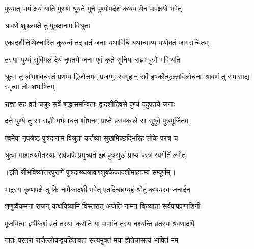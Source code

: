 

\twolineshloka
{पुण्यात् पापं क्षयं याति पुराणे श्रूयते मुने}
{पुण्योपदेशं कथय येन पापक्षयो भवेत्} %



\onelineshloka
{श्रावणे शुक्लपक्षे तु पुत्रदानाम विश्रुता} %

\twolineshloka
{एकादशीतिथिश्चास्ति कुरुध्वं तद् व्रतं जनाः}
{यथाविधि यथान्याय्य यथोक्तं जागरान्वितम्} %

\twolineshloka
{तस्याः पुण्यं सुविमलं देयं नृपतये जनाः}
{एवं कृते सुनिया राज्ञः पुत्रो भविष्यति} %

\threelineshloka
{श्रुत्वा तु लोमशवचस्तं प्रणम्य द्विजोत्तमम्}
{प्रजग्मुः स्वगृहान् सर्वे हषर्कोत्फुल्लविलोचनाः}
{श्रावणं तु समासाद्य स्मृत्वा लोमशभाषितम्} %

\twolineshloka
{राज्ञा सह व्रतं चक्रुः सर्वे श्रद्धासमन्विताः}
{द्वादशीदिवसे पुण्यं ददुपतये जनाः} %

\twolineshloka
{दत्ते पुण्ये तु सा राज्ञी गर्भमाधत्त शोभनम्}
{प्राप्ते प्रसवकाले सा सुषुवे पुत्रमूर्जितम्} %

\twolineshloka
{एवमेषा नृपश्रेष्ठ पुत्रदानाम विश्रुता}
{कर्तव्या सुखमिच्छद्भिरिह लोके परत्र च} %

\twolineshloka
{श्रुत्वा माहात्म्यमेतस्याः सर्वपापैः प्रमुच्यते}
{इह पुत्रसुखं प्राप्य परत्र स्वर्गतिं लभेत्} %

॥इति श्रीभविष्योत्तरपुराणे पुत्रदाख्यश्रावणशुक्कैकादशीमाहात्म्यं सम्पूर्णम्॥


\hyperref[sec:ekadashi_mahatmyam_vrata_raja]{\closesub}
\clearpage

\label{sec:vrata-raja-bhadrapada-krishnaja}


\twolineshloka
{भाद्रस्य कृष्णपक्षे तु किं नामैकादशी भवेत्}
{एतदिच्छाम्यहं श्रोतुं कथयस्व जनार्दन} %


\twolineshloka
{शृणुष्वैकमना राजन् कथयिष्यामि विस्तरात्}
{अजेति नाम्ना विख्याता सर्वपापप्रणाशिनी} %

\twolineshloka
{पूजयित्वा हृषीकेशं व्रतं तस्याः करोति यः}
{पापानि तस्य नश्यन्ति व्रतस्य श्रवणादपि} %

\twolineshloka
{नातः परतरा राजैल्लोकद्वयहितावहा}
{सत्यमुक्तं मया ह्येतेन्नासत्यं भाषितं मम} %

